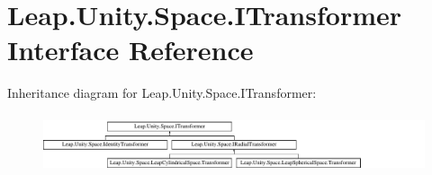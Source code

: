 \hypertarget{interface_leap_1_1_unity_1_1_space_1_1_i_transformer}{}\section{Leap.\+Unity.\+Space.\+I\+Transformer Interface Reference}
\label{interface_leap_1_1_unity_1_1_space_1_1_i_transformer}
Inheritance diagram for Leap.\+Unity.\+Space.\+I\+Transformer\+:\begin{figure}[H]
\begin{center}
\leavevmode
\includegraphics[height=1.739130cm]{interface_leap_1_1_unity_1_1_space_1_1_i_transformer}
\end{center}
\end{figure}

